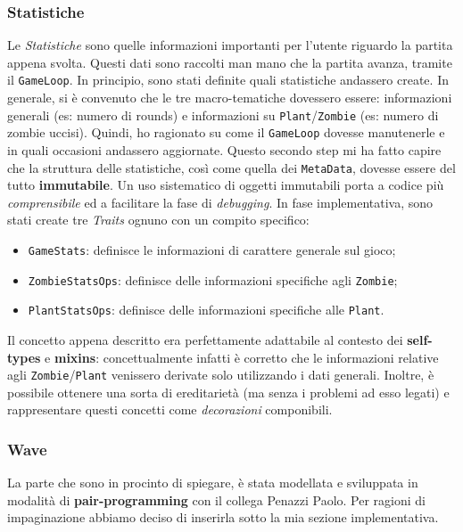 \subsubsection{Statistiche}
Le \textit{Statistiche} sono quelle informazioni importanti per l'utente riguardo la partita appena svolta. Questi dati sono raccolti man mano che la partita avanza, tramite il \texttt{GameLoop}. In principio, sono stati definite quali statistiche andassero create. In generale, si è convenuto che le tre macro-tematiche dovessero essere: informazioni generali (es: numero di rounds) e informazioni su \texttt{Plant}/\texttt{Zombie} (es: numero di zombie uccisi). Quindi, ho ragionato su come il \texttt{GameLoop} dovesse manutenerle e in quali occasioni andassero aggiornate. Questo secondo step mi ha fatto capire che la struttura delle statistiche, così come quella dei \texttt{MetaData}, dovesse essere del tutto \textbf{immutabile}. Un uso sistematico di oggetti immutabili porta a codice più \textit{comprensibile} ed a facilitare la fase di \textit{debugging}. In fase implementativa, sono stati create tre \textit{Traits} ognuno con un compito specifico:
\begin{itemize}
    \item \texttt{GameStats}: definisce le informazioni di carattere generale sul gioco;
    \item \texttt{ZombieStatsOps}: definisce delle informazioni specifiche agli \texttt{Zombie};
    \item \texttt{PlantStatsOps}: definisce delle informazioni specifiche alle \texttt{Plant}.
\end{itemize}
Il concetto appena descritto era perfettamente adattabile al contesto dei \textbf{self-types} e \textbf{mixins}: concettualmente infatti è corretto che le informazioni relative agli \texttt{Zombie}/\texttt{Plant} venissero derivate solo utilizzando i dati generali. Inoltre, è possibile ottenere una sorta di ereditarietà (ma senza i problemi ad esso legati) e rappresentare questi concetti come \textit{decorazioni} componibili. 



\subsubsection{Wave}
La parte che sono in procinto di spiegare, è stata modellata e sviluppata in modalità di \textbf{pair-programming} con il collega Penazzi Paolo. Per ragioni di impaginazione abbiamo deciso di inserirla sotto la mia sezione implementativa.\\

